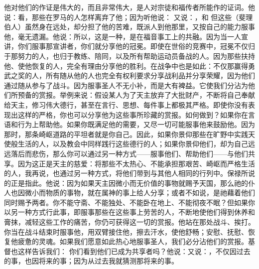 他对他们的作证是伟大的，而且非常伟大，是人对宗徒和福传者所能作的证词。他说：看，那些在罗马的人怎样离弃了他；因为听他说： 又说：，和 但这些（斐理伯人）虽然身在远处，却分担了他的苦难，既派人到他那里，又按自己的能力服事他，毫无遗漏。他说：所以，这是一种，是在福音事工上的共融。因为当一人宣讲，你们服事那宣讲者，你们就分享他的冠冕。即使在世俗的竞赛中，冠冕不仅归于那努力的人，也归于教练、陪同，以及所有帮助运动员备战的人。因为那些扶持他、使他恢复的人，完全有理由分享他的胜利。在战争中也是如此：不仅那赢得勇武之奖的人，所有随从他的人也完全有权利要求分享战利品并分享荣耀，因为他们通过随从参与了战斗。因为服事圣人不无小补，而是大有裨益。它使我们分沾为他们所预备的赏报。举例来说：假设某人为了天主放弃了大批财产，不断将自己奉献给天主，修习伟大德行，甚至在言行、思想、每件事上都极其严格。即使你没有表现出这样的严格，你也可以分享他为这些事所珍藏的赏报。如何做到？如果你在言语和行为上帮助他。如果你既满足他的需要，又尽一切可能服事他来鼓励他。因为那时，那条崎岖道路的平坦者就是你自己。因此，如果你景仰那些在旷野中实践天使般生活的人，以及教会中同样践行这些德行的人；如果你景仰他们，却为自己远远落后而悲伤，那么你可以通过另一种方式——服事他们、帮助他们——与他们共享。因为这正是天主的慈爱：将那些不太热心、不能承担那艰苦、崎岖而严格生活的人，我再说，也通过另一种方式，将他们带到与其他人相同的行列中。保禄所说的正是指此。他说：因为如果天主因微小而无价值的事物就赐予天国，那么祂的仆人也因微小而物质的事物，就在属神的事上给人分享；或者不如说，是祂藉着他们同时赐予两者。你不能守斋、不能独处、不能卧在地上、不能彻夜不眠？但如果你以另一种方式行此事，即服事那些在这些事上劳苦的人，不断地使他们得到休养和膏抹，减轻这些工作的痛苦，你仍可获得这一切的赏报。他站在那处战斗、挨打。你当在战斗结束时服事他，用双臂接住他，擦去汗水，使他舒畅；安慰、抚慰、恢复他疲惫的灵魂。如果我们愿意如此热心地服事圣人，我们必分沾他们的赏报。基督也这样告诉我们： 你们看到他们已成为共享者吗？他说：又说：，不仅因过去的事，也因将来的事；因为从过去我就猜测那将来的事。\par


